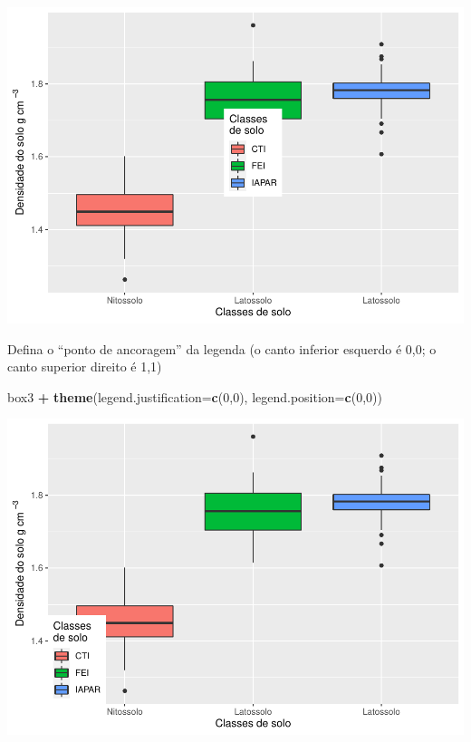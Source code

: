 \documentclass[
]{book}
\newenvironment{Shaded}{\begin{snugshade}}{\end{snugshade}}
\newcommand{\DataTypeTok}[1]{\textcolor[rgb]{0.13,0.29,0.53}{#1}}
\newcommand{\DecValTok}[1]{\textcolor[rgb]{0.00,0.00,0.81}{#1}}
\newcommand{\KeywordTok}[1]{\textcolor[rgb]{0.13,0.29,0.53}{\textbf{#1}}}
\newcommand{\NormalTok}[1]{#1}
\newcommand{\OperatorTok}[1]{\textcolor[rgb]{0.81,0.36,0.00}{\textbf{#1}}}
\newcommand{\StringTok}[1]{\textcolor[rgb]{0.31,0.60,0.02}{#1}}
\begin{document}
\includegraphics{TudodoR_files/figure-latex/unnamed-chunk-216-1.pdf}

Defina o ``ponto de ancoragem'' da legenda (o canto inferior esquerdo é 0,0; o canto superior direito é 1,1)

\begin{Shaded}
\begin{Highlighting}[]
\NormalTok{box3 }\OperatorTok{+}\StringTok{ }\KeywordTok{theme}\NormalTok{(}\DataTypeTok{legend.justification=}\KeywordTok{c}\NormalTok{(}\DecValTok{0}\NormalTok{,}\DecValTok{0}\NormalTok{), }\DataTypeTok{legend.position=}\KeywordTok{c}\NormalTok{(}\DecValTok{0}\NormalTok{,}\DecValTok{0}\NormalTok{))}
\end{Highlighting}
\end{Shaded}

\includegraphics{TudodoR_files/figure-latex/unnamed-chunk-217-1.pdf}
\end{document}
